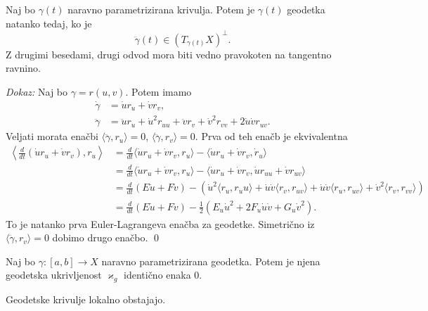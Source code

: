 \begin{izrek}
\label{izr_karakterizacija_geodetke_pri_naravni_parametrizaciji}
 Naj bo $\gamma(t)$ naravno parametrizirana krivulja. Potem je $\gamma(t)$ geodetka natanko tedaj, ko je \begin{equation*}
 \ddot{\gamma}(t) \in (T_{\gamma(t)}X)^{\perp}.
 \end{equation*}  
Z drugimi besedami, drugi odvod mora biti vedno pravokoten na tangentno ravnino.
\end{izrek}
\noindent
{\em Dokaz:\/}
Naj bo $\gamma = r(u,v)$. Potem imamo \begin{align*}
    \dot{\gamma} &= \dot{u} r_u + \dot{v} r_v ,\\
    \ddot{\gamma} &= \ddot{u} r_u + \dot{u}^2 r_{uu} + \ddot{v} r_v + \dot{v}^2r_{vv} + 2\dot{u}\dot{v}r_{uv}.
\end{align*}
Veljati morata enačbi $\langle \ddot{\gamma}, r_u \rangle = 0$, $\langle \ddot{\gamma}, r_v \rangle  = 0$. Prva od teh enačb
je ekvivalentna \begin{align*}
    \left\langle \frac{d}{dt} (\dot{u} r_u + \dot{v} r_v), r_u \right\rangle  &= \frac{d}{dt}  \langle \dot{u} r_u + \dot{v} r_v, r_u \rangle - \langle \dot{u} r_u + \dot{v} r_v, \dot{r}_u \rangle \\
     &= \frac{d}{dt}  \langle \dot{u} r_u + \dot{v} r_v, r_u \rangle - \langle \dot{u} r_u + \dot{v} r_v, \dot{u} r_{uu} + \dot{v} r_{uv} \rangle \\
     &= \frac{d}{dt} (E \dot{u} + F\dot{v}) - (\dot{u}^2 \langle r_u, r_uu \rangle + \dot{u} \dot{v} \langle r_v, r_{uv} \rangle + \dot{u} \dot{v} \langle r_u, r_{uv} \rangle + \dot{v}^2 \langle r_v, r_{vv}  \rangle  ) \\
     &= \frac{d}{dt}   (E \dot{u} + F\dot{v}) - \frac{1}{2} (E_u \dot{u}^2 + 2 F_u \dot{u} \dot{v} + G_u \dot{v}^2).
    \end{align*}
To je natanko prva Euler-Lagrangeva enačba za geodetke. Simetrično iz $\langle \ddot{\gamma}, r_v \rangle  = 0$ dobimo drugo enačbo.
\qed

\begin{posledica}
\label{psl_geodetksa_ukrivljenost_naravno_parametrziranih_geodetk_je_0}
Naj bo $\gamma: [a,b] \to X$ naravno parametrizirana geodetka. Potem je njena geodetska ukrivljenost $\varkappa_g$ identično enaka $0$.
\end{posledica}

\begin{trditev}
\label{trd_lokalni_obstoj_geodetk}
Geodetske krivulje lokalno obstajajo.
\end{trditev}

